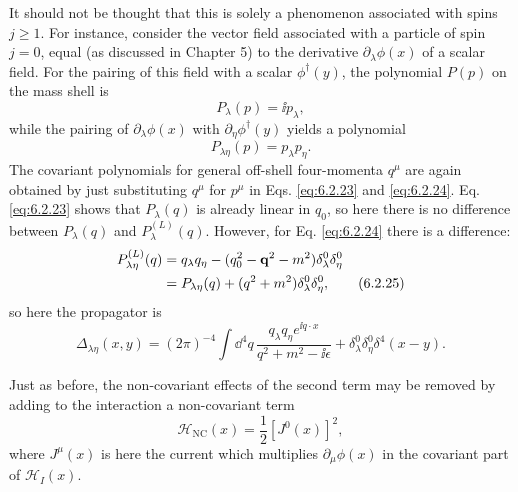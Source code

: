 It should not be thought that this is solely a phenomenon associated with
spins $j\geq1$. For instance, consider the vector field associated with a
particle of spin $j=0$, equal (as discussed in Chapter 5) to the derivative
$\partial_\lambda\phi(x)$ of a scalar field. For the pairing of this field with
a scalar $\phi^\dagger(y)$, the polynomial $P(p)$ on the mass shell is
\begin{equation}
P_\lambda(p)=\ii p_\lambda,
\tag{6.2.23}
\label{eq:6.2.23}
\end{equation}
while the pairing of $\partial_\lambda\phi(x)$ with
$\partial_\eta\phi^\dagger(y)$ yields a polynomial
\begin{equation}
P_{\lambda\eta}(p)=p_\lambda p_\eta.
\tag{6.2.24}
\label{eq:6.2.24}
\end{equation}
The covariant polynomials for general off-shell four-momenta $q^\mu$ are again
obtained by just substituting $q^\mu$ for $p^\mu$ in Eqs. \eqref{eq:6.2.23} and
\eqref{eq:6.2.24}. Eq. \eqref{eq:6.2.23} shows that $P_\lambda(q)$ is already linear in $q_0$, so
here there is no difference between $P_\lambda(q)$ and $P_\lambda^{(L)}(q)$.
However, for Eq. \eqref{eq:6.2.24} there is a difference:
\begin{align}
P_{\lambda\eta}^{(L)}(q)
={}&q_\lambda q_\eta-(q_0^2-\mathbf q^2-m^2)
 \delta_\lambda^0\delta_\eta^0
\notag\\
={}&P_{\lambda\eta}(q)+(q^2+m^2)\delta_\lambda^0\delta_\eta^0,
\tag{6.2.25}
\label{eq:6.2.25}
\end{align}
so here the propagator is
\begin{equation}
\Delta_{\lambda\eta}(x,y)=(2\pi)^{-4}\int \dd^4q\,
 \frac{q_\lambda q_\eta e^{\ii q\cdot x}}{q^2+m^2-\ii\epsilon}
 +\delta_\lambda^0\delta_\eta^0\delta^4(x-y).
\tag{6.2.26}
\label{eq:6.2.26}
\end{equation}

Just as before, the non-covariant effects of the second term may be removed by
adding to the interaction a non-covariant term
\begin{equation}
\mathcal H_{\mathrm{NC}}(x)=\frac12[J^0(x)]^2,
\tag{6.2.27}
\label{eq:6.2.27}
\end{equation}
where $J^\mu(x)$ is here the current which multiplies
$\partial_\mu\phi(x)$ in the covariant part of $\mathcal H_I(x)$.

